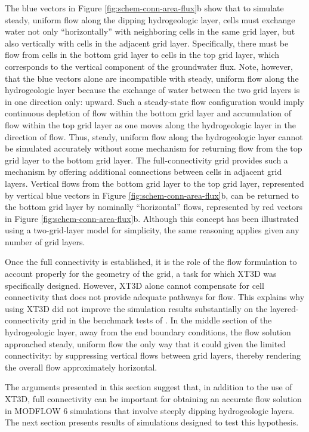 \documentclass{article}
\begin{document}
The blue vectors in Figure \ref{fig:schem-conn-area-flux}b show that to simulate steady, uniform flow along the dipping hydrogeologic layer, cells must exchange water not only ``horizontally'' with neighboring cells in the same grid layer, but also vertically with cells in the adjacent grid layer. Specifically, there must be flow from cells in the bottom grid layer to cells in the top grid layer, which corresponds to the vertical component of the groundwater flux. Note, however, that the blue vectors alone are incompatible with steady, uniform flow along the hydrogeologic layer because the exchange of water between the two grid layers is in one direction only: upward. Such a steady-state flow configuration would imply continuous depletion of flow within the bottom grid layer and accumulation of flow within the top grid layer as one moves along the hydrogeologic layer in the direction of flow. Thus, steady, uniform flow along the hydrogeologic layer cannot be simulated accurately without some mechanism for returning flow from the top grid layer to the bottom grid layer. The full-connectivity grid provides such a mechanism by offering additional connections between cells in adjacent grid layers. Vertical flows from the bottom grid layer to the top grid layer, represented by vertical blue vectors in Figure \ref{fig:schem-conn-area-flux}b, can be returned to the bottom grid layer by nominally ``horizontal'' flows, represented by red vectors in Figure \ref{fig:schem-conn-area-flux}b. Although this concept has been illustrated using a two-grid-layer model for simplicity, the same reasoning applies given any number of grid layers.

Once the full connectivity is established, it is the role of the flow formulation to account properly for the geometry of the grid, a task for which XT3D was specifically designed. However, XT3D alone cannot compensate for cell connectivity that does not provide adequate pathways for flow. This explains why using XT3D did not improve the simulation results substantially on the layered-connectivity grid in the benchmark tests of \cite{bardot2022}.  In the middle section of the hydrogeologic layer, away from the end boundary conditions, the flow solution approached steady, uniform flow the only way that it could given the limited connectivity: by suppressing vertical flows between grid layers, thereby rendering the overall flow approximately horizontal.

The arguments presented in this section suggest that, in addition to the use of XT3D, full connectivity can be important for obtaining an accurate flow solution in MODFLOW 6 simulations that involve steeply dipping hydrogeologic layers. The next section presents results of simulations designed to test this hypothesis.
\end{document}
